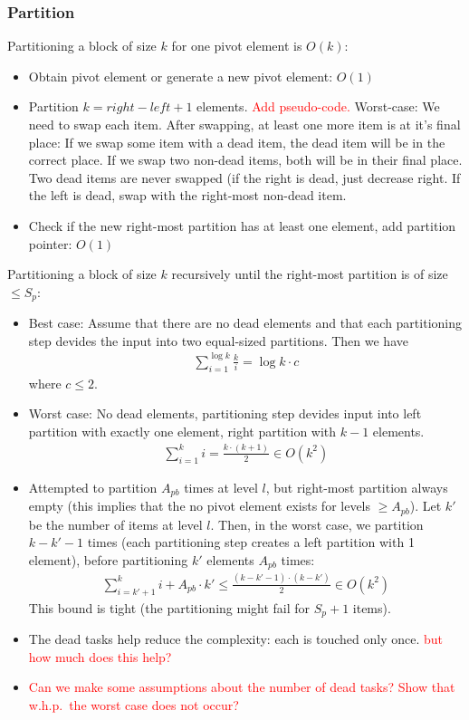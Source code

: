 \documentclass[a4paper,12pt]{article}
\newcommand\todo[1]{\textcolor{red}{#1}}
\renewcommand\O[1]{O\left(#1\right)}
\newcommand\apb{A_{pb}}
\newcommand\lvl{l}
\begin{document}
\subsubsection{Partition}\label{sec:complexity:partition}
Partitioning a block of size $k$ for one pivot element is $\O{k}$:
\begin{itemize}
\item Obtain pivot element or generate a new pivot element: $\O{1}$
\item Partition $k = right - left + 1$ elements. \todo{Add pseudo-code.} Worst-case: We need to swap each item. After swapping, at least one more item is at it's final place: If we swap some item with a dead item, the dead item will be in the correct place. If we swap two non-dead items, both will be in their final place. Two dead items are never swapped (if the right is dead, just decrease right. If the left is dead, swap with the right-most non-dead item.
\item Check if the new right-most partition has at least one element, add partition pointer: $\O{1}$ 
\end{itemize}

Partitioning a block of size $k$ recursively until the right-most partition is of size $\leq S_p$:

\begin{itemize}
\item Best case: Assume that there are no dead elements and that each partitioning step devides the input into two equal-sized partitions. Then we have
\begin{align*}
\sum_{i=1}^{\log k} \frac{k}{i} = \log k \cdot c
\end{align*}
where $c \leq 2$.
\item Worst case: No dead elements, partitioning step devides input into left partition with exactly one element, right partition with $k-1$ elements.
\begin{align*}
\sum_{i=1}^{k} i = \frac{k\cdot(k+1)}{2} \in \O{k^2}
\end{align*}
\item Attempted to partition $\apb$ times at level $\lvl$, but right-most partition always empty (this implies that the no pivot element exists for levels $\geq \apb$). Let $k'$ be the number of items at level $\lvl$. Then, in the worst case, we partition $k-k'-1$ times (each partitioning step creates a left partition with 1 element), before partitioning $k'$ elements $\apb$ times:
\begin{align*}
\sum_{i=k'+1}^{k} i + \apb\cdot k' \leq \frac{\left(k-k'-1\right)\cdot\left(k-k'\right)}{2} \in \O{k^2}
\end{align*}
This bound is tight (the partitioning might fail for $S_p+1$ items).

\item The dead tasks help reduce the complexity: each is touched only once. \todo{but how much does this help?}
\item \todo{Can we make some assumptions about the number of dead tasks? Show that w.h.p.~the worst case does not occur?}
\end{itemize}
\end{document}
